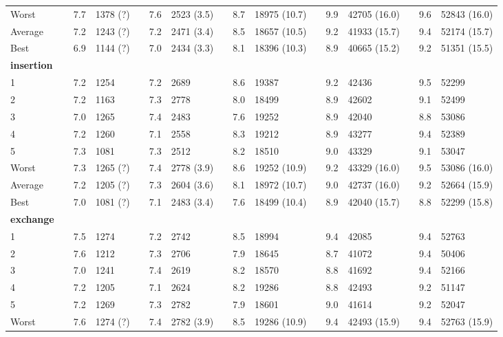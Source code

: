 \begin{sidewaystable}[hbpt]
{\begin{tabular} {l l S  l l S l l S l l S l l S l}
Worst  &&  7.7 & 1378 (?) && 7.6 & 2523 (3.5) &&  8.7  &  18975  (10.7) && 9.9  & 42705 (16.0) &&  9.6 &  52843 (16.0)  \\
Average&&  7.2 & 1243 (?) && 7.2 & 2471 (3.4) &&8.5  & 18657  (10.5) && 9.2  &  41933 (15.7) && 9.4 &  52174 (15.7)    \\
Best   && 6.9 & 1144 (?) && 7.0 & 2434 (3.3)  &&  8.1 & 18396  (10.3) &&  8.9 &  40665 (15.2) &&  9.2 &  51351 (15.5)    \\\midrule\addlinespace\addlinespace
\textbf{insertion} \\
1   &&  7.2 & 1254 && 7.2 & 2689  &&  8.6 & 19387  && 9.2 & 42436 && 9.5 & 52299 \\
2   &&  7.2 & 1163 && 7.3 & 2778  && 8.0 & 18499 && 8.9 & 42602 &&  9.1 & 52499   \\
3   &&  7.0 & 1265 && 7.4 & 2483 &&  7.6 & 19252 &&  8.9   & 42040  && 8.8  & 53086     \\
4   &&  7.2 & 1260 && 7.1 & 2558  && 8.3     & 19212   && 8.9 & 43277  && 9.4 & 52389  \\
5   &&  7.3 & 1081 && 7.3 & 2512  && 8.2   & 18510       && 9.0 & 43329 && 9.1   &  53047  \\ \addlinespace
Worst  &&  7.3 & 1265 (?) && 7.4 & 2778 (3.9) &&  8.6  &  19252  (10.9) && 9.2  & 43329 (16.0) &&  9.5 &  53086 (16.0)  \\
Average&&  7.2 & 1205 (?) && 7.3 & 2604 (3.6) && 8.1  & 18972  (10.7) && 9.0  &  42737 (16.0) && 9.2 &  52664 (15.9)    \\
Best   && 7.0 & 1081 (?) && 7.1 & 2483 (3.4)  &&  7.6 & 18499  (10.4)&&  8.9 &  42040 (15.7) &&  8.8 &  52299 (15.8)     
\\\midrule\addlinespace\addlinespace
\textbf{exchange} \\
1   &&  7.5 & 1274 && 7.2 & 2742  &&  8.5 & 18994  && 9.4 & 42085 && 9.4 & 52763 \\
2   &&  7.6 & 1212 && 7.3 & 2706  && 7.9 & 18645 && 8.7 & 41072 &&  9.4 & 50406   \\
3   &&  7.0 & 1241 && 7.4 & 2619 &&  8.2 & 18570 &&  8.8   & 41692  &&  9.4  & 52166     \\
4   &&  7.2 & 1205 && 7.1 & 2624  && 8.2     & 19286   && 8.8 & 42493  && 9.2 & 51147  \\
5   &&  7.2 & 1269 && 7.3 & 2782  && 7.9  & 18601      && 9.0 & 41614 && 9.2   &  52047  \\ \addlinespace
Worst  && 7.6  & 1274 (?) && 7.4 & 2782 (3.9) &&  8.5  &  19286  (10.9) && 9.4  & 42493 (15.9) &&  9.4 &  52763 (15.9)  \\

\end{tabular}}
\end{sidewaystable}
